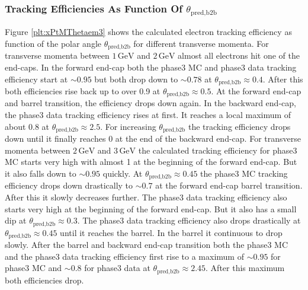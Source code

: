 \documentclass[a4paper,11pt,twosided,final,german,openbib,pdftex,listof=totoc,bibliography=totoc]{scrbook}
\begin{document}
\newpage

\subsubsection{Tracking Efficiencies As Function Of $\theta_{\textrm{pred,b2b}}$}

Figure \ref{plt:xPtMThetaem3} shows the calculated electron tracking efficiency as function of the polar angle $\theta_{\textrm{pred,b2b}}$ for different transverse momenta.
For transverse momenta between $1\,\textrm{GeV}$ and $2\,\textrm{GeV}$ almost all electrons hit one of the end-caps. In the forward end-cap both the phase3 MC and phase3 data tracking efficiency start at $\sim 0.95$ but both drop down to $\sim 0.78$ at $\theta_{\textrm{pred,b2b}} \approx 0.4$. After this both efficiencies rise back up to over 0.9 at $\theta_{\textrm{pred,b2b}} \approx 0.5$. At the forward end-cap and barrel transition, the efficiency drops down again. In the backward end-cap, the phase3 data tracking efficiency rises at first. It reaches a local maximum of about 0.8 at $\theta_{\textrm{pred,b2b}} \approx 2.5$. For increasing $\theta_{\textrm{pred,b2b}}$ the tracking efficiency drops down until it finally reaches 0 at the end of the backward end-cap.
For transverse momenta between $2\,\textrm{GeV}$ and $3\,\textrm{GeV}$ the calculated tracking efficiency for phase3 MC starts very high with almost 1 at the beginning of the forward end-cap. But it also falls down to $\sim 0.95$ quickly. At $\theta_{\textrm{pred,b2b}} \approx 0.45$ the phase3 MC tracking efficiency drops down drastically to $\sim 0.7$ at the forward end-cap barrel transition. After this it slowly decreases further. The phase3 data tracking efficiency also starts very high at the beginning of the forward end-cap. But it also has a small dip at $\theta_{\textrm{pred,b2b}} \approx 0.3$. The phase3 data tracking efficiency also drops drastically at $\theta_{\textrm{pred,b2b}} \approx 0.45$ until it reaches the barrel. In the barrel it continuous to drop slowly. After the barrel and backward end-cap transition both the phase3 MC and the phase3 data tracking efficiency first rise to a maximum of $\sim 0.95$ for phase3 MC and $\sim 0.8$ for phase3 data at $\theta_{\textrm{pred,b2b}} \approx 2.45$. After this maximum both efficiencies drop.
\end{document}
